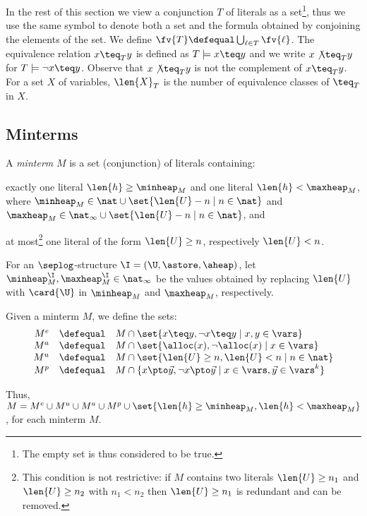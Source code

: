 In the rest of this section we view a conjunction $T$ of literals as a
set\footnote{The empty set is thus considered to be true.}, thus we
use the same symbol to denote both a set and the formula obtained by
conjoining the elements of the set. We define $\fv{T} \defequal
\bigcup_{\ell \in T} \fv{\ell}$. The equivalence relation $x \teq_T y$
is defined as $T \models x \teq y$ and we write $x \not\teq_T y$ for
$T \models \neg x \teq y$. Observe that $x \not\teq_T y$ is not the
complement of $x \teq_T y$. For a set $X$ of variables, $\len{X}_T$ is
the number of equivalence classes of $\teq_T$ in $X$.

\subsection{Minterms}

A \emph{minterm} $M$ is a set (conjunction) of literals containing: 
\begin{compactitem}
\item exactly one literal $\len{h} \geq \minheap_M$ and one literal
  $\len{h} < \maxheap_M$, where $\minheap_M \in \nat \cup \set{\len{U}
  - n \mid n \in \nat}$ and $\maxheap_M \in \nat_{\infty} \cup
  \set{\len{U} - n \mid n \in \nat}$, and
%
\item at most\footnote{This condition is not restrictive: if $M$
  contains two literals $\len{U} \geq n_1$ and $\len{U} \geq n_2$ with
  $n_1 < n_2$ then $\len{U} \geq n_1$ is redundant and can be
  removed.} one literal of the form $\len{U} \geq n$, respectively
  $\len{U} < n$.
\end{compactitem}
For an $\seplog$-structure $\I = (\U,\astore,\aheap)$, let
$\minheap_M^\I, \maxheap_M^\I \in \nat_{\infty}$ be the values
obtained by replacing $\len{U}$ with $\card{\U}$ in $\minheap_M$ and
$\maxheap_M$, respectively.

\begin{definition}\label{def:minterm-sets}
Given a minterm $M$, we define the sets:
\[\begin{array}{rcl}
M^e & \defequal & M \cap \set{x \teq y, \neg x \teq y \mid x,y \in \vars} \\ 
M^a & \defequal & M \cap \set{\alloc(x),\neg\alloc(x) \mid x \in \vars} \\
M^u & \defequal & M \cap \set{\len{U} \geq n, \len{U} < n \mid n \in \nat} \\
M^p & \defequal & M \cap \{x \pto \vec{y}, \neg x \pto
  \vec{y} \mid x \in \vars, \vec{y} \in \vars^k\}
\end{array}\]
\end{definition}
Thus, $M = M^e \cup M^u \cup M^a \cup M^p \cup
\set{\len{h} \geq \minheap_M, \len{h} < \maxheap_M}$, for each minterm
$M$.

